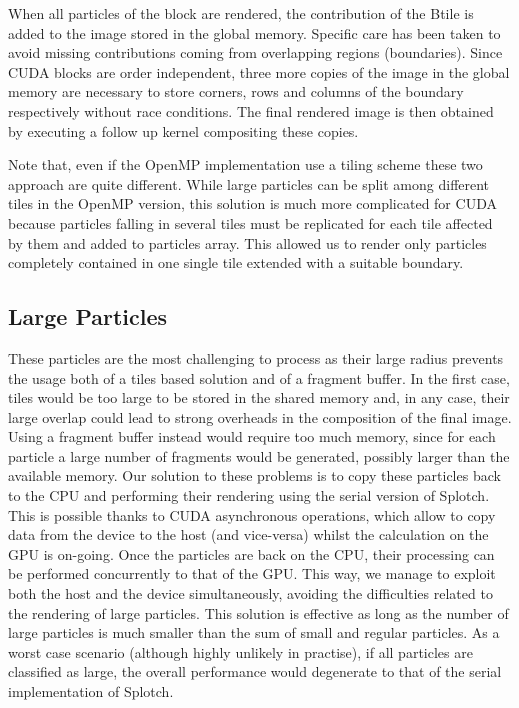 \documentclass[1p]{elsarticle}
\begin{document}
When all particles of the block are rendered, the contribution of the Btile is added to the image stored in the global memory. Specific care has been taken to avoid missing contributions coming
from overlapping regions (boundaries). Since CUDA blocks are order independent, three more copies of the image in the global memory are necessary to store corners, rows and columns of the boundary respectively without race conditions. The final rendered image is then obtained by executing a follow up kernel compositing these copies.

Note that, even if the OpenMP implementation use a tiling scheme these two approach are quite different. While large particles can be split among different tiles in the OpenMP version, this solution is much more complicated for CUDA because particles falling in several tiles must be replicated for each tile affected by them and added to particles array. This allowed us to render only particles completely contained in one single tile extended with a suitable boundary. 

\subsection{Large Particles}
\label{sec:largeparticles}
These particles are the most challenging to process as their large
radius prevents the usage both of a tiles based solution and of a fragment buffer.
In the first case, tiles would be too large to be stored in the shared memory
and, in any case, their large overlap could lead to strong overheads in the composition of the
final image. Using a fragment buffer instead would require too much memory, since
for each particle a large number of fragments would be generated, possibly
larger than the available memory. Our solution to these problems is to copy these particles back to the CPU and performing their rendering
using the serial version of Splotch. This is possible thanks to CUDA asynchronous
operations, which allow to copy data from the device to the host (and vice-versa)
whilst the calculation on the GPU is on-going. Once the particles are back on the CPU,
their processing can be performed concurrently to that of the GPU.  
This way, we manage to exploit both the host and the device simultaneously, avoiding the difficulties related to the rendering of large
particles. This solution is effective as long as the number of large particles
is much smaller than the sum of small and regular particles. As a worst case scenario (although highly unlikely in practise), if all particles are classified as large, the overall performance would degenerate to that of the serial implementation of Splotch.
\end{document}
